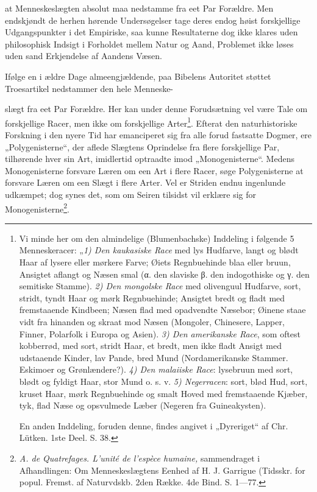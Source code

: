 \documentclass[12pt,a4paper]{book}
\begin{document}
at Menneskeslægten absolut maa nedstamme fra eet Par Forældre. Men endskjøndt de
herhen hørende Undersøgelser tage deres endog høist forskjellige Udgangspunkter
i det Empiriske, saa kunne Resultaterne dog ikke klares uden philosophisk
Indsigt i Forholdet mellem Natur og Aand, Problemet ikke løses uden sand
Erkjendelse af Aandens Væsen.

Ifølge en i ældre Dage almeengjældende, paa Bibelens Autoritet støttet
Troesartikel nedstammer den hele Menneske-

\setcounter{footnote}{0}
slægt fra eet Par Forældre. Her kan under denne Forudsætning vel være Tale om
forskjellige Racer, men ikke om forskjellige Arter\footnote{Vi minde her om den
almindelige (Blumenbachske) Inddeling i følgende 5 Menneskeracer: „\emph{1) Den
kaukasiske Race} med lys Hudfarve, langt og blødt Haar af lysere eller mørkere
Farve; Øiets Regnbuehinde blaa eller bruun, Ansigtet aflangt og Næsen smal
(α. den slaviske β. den indogothiske og γ. den semitiske Stamme).
\emph{2) Den mongolske Race} med olivenguul Hudfarve, sort, stridt, tyndt Haar
og mørk Regnbuehinde; Ansigtet bredt og fladt med fremstaaende Kindbeen; Næsen
flad med opadvendte Næsebor; Øinene staae vidt fra hinanden og skraat mod Næsen
(Mongoler, Chinesere, Lapper, Finner, Polarfolk i Europa og Asien).
\emph{3) Den amerikanske Race}, som oftest kobberrød, med sort, stridt Haar, et
bredt, men ikke fladt Ansigt med udstaaende Kinder, lav Pande, bred Mund
(Nordamerikanske Stammer. Eskimoer og Grønlændere?). \emph{4) Den malaiiske
Race}: lysebruun med sort, blødt og fyldigt Haar, stor Mund o. s. v.
\emph{5) Negerracen}: sort, blød Hud, sort, kruset Haar, mørk Regnbuehinde og
smalt Hoved med fremstaaende Kjæber, tyk, flad Næse og opsvulmede Læber (Negeren
fra Guineakysten).

En anden Inddeling, foruden denne, findes angivet i „Dyreriget“ af Chr. Lütken.
1ste Deel. S. 38.}. Efterat den naturhistoriske Forskning i den nyere Tid har
emanciperet sig fra alle forud fastsatte Dogmer, ere „Polygenisterne“, der aflede
Slægtens Oprindelse fra flere forskjellige Par, tilhørende hver sin Art,
imidlertid optraadte imod „Monogenisterne“. Medens Monogenisterne forsvare Læren
om een Art i flere Racer, søge Polygenisterne at forsvare Læren om een Slægt i
flere Arter. Vel er Striden endnu ingenlunde udkæmpet; dog synes det, som om
Seiren tilsidst vil erklære sig for Monogenisterne\footnote{\textit{A. de
Quatrefages. L'unité de l'espèce humaine,} sammendraget i Afhandlingen: Om
Menneskeslægtens Eenhed af H. J. Garrigue (Tidsskr. for popul. Fremst. af
Naturvdskb. 2den Række. 4de Bind. S. 1---77.
}.
\end{document}
